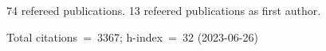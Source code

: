 74 refereed publications. 13 refeered publications as first author.

Total citations~=~3367; h-index~=~32 (2023-06-26)